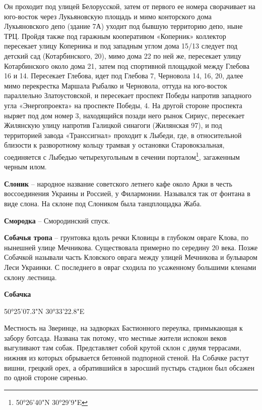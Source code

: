 Он проходит под улицей Белорусской, затем от первого ее номера сворачивает на юго-восток через Лукьяновскую площадь и мимо конторского дома Лукьяновского депо (здание 7А) уходит под бывшую территорию депо, ныне ТРЦ. Пройдя также под гаражным кооперативом «Коперник» коллектор пересекает улицу Коперника и под западным углом дома 15/13 следует под детский сад (Котарбинского, 20), мимо дома 22 по ней же, пересекает улицу Котарбинского около дома 21, затем под спортивной площадкой между Глебова 16 и 14. Пересекает Глебова, идет под Глебова 7, Черновола 14, 16, 20, далее мимо перекрестка Маршала Рыбалко и Черновола, оттуда на юго-восток параллельно Златоустовской, и пересекает проспект Победы напротив западного угла «Энергопроекта» на проспекте Победы, 4. На другой стороне проспекта ныряет под дом номер 3, находящийся позади него рынок Сириус, пересекает Жилянскую улицу напротив Галицкой синагоги (Жилянская 97), и под территорией завода «Транссигнал» проходит к Лыбеди, где, в относительной близости к разворотному кольцу трамвая у остановки Старовокзальная, соединяется с Лыбедью четырехугольным в сечении порталом\footnote{50°26'40"N 30°29'9"E}, загаженным черным илом.\\

\medskip

\textbf{Слоник} – народное название советского летнего кафе около Арки в честь воссоединения Украины и Россией, у Филармонии. Назывался так от фонтана в виде слона. На склоне под Слоником была танцплощадка Жаба.\\

\medskip


\textbf{Смородка} – Смородинский спуск.\\

\medskip

\textbf{Собачья тропа} – грунтовка вдоль речки Кловицы в глубоком овраге Клова, по нынешней улице Мечникова. Существовала примерно по середину 20 века. Позже Собачкой называли часть Кловского оврага между улицей Мечникова и бульваром Леси Украинки. С последнего в овраг сходила по усаженному большими кленами склону лестница.\\

\medskip

\textbf{Собачка} 

50°25'07.3"N 30°33'22.8"E

Местность на Зверинце, на задворках Бастионного переулка, примыкающая к забору ботсада. Названа так потому, что местные жители испокон веков выгуливают там собак. Представляет собой крутой склон с двумя террасами, нижняя из которых обрывается бетонной подпорной стеной. На Собачке растут вишни, грецкий орех, а обратившийся в заросший пустырь стадион был обсажен по одной стороне сиренью.


